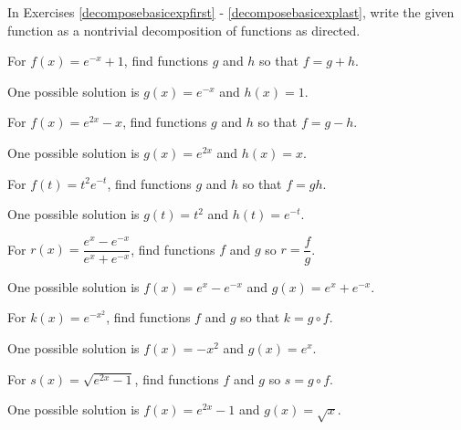 \documentclass{ximera}
\begin{document}
\begin{question}
In Exercises \ref{decomposebasicexpfirst} - \ref{decomposebasicexplast}, write the given function as a nontrivial decomposition of functions as directed.

\begin{problem}\label{decomposebasicexpfirst}
For $f(x) = e^{-x} +1 $, find functions $g$ and $h$ so that $f=g+h$.

\begin{solution}
One possible solution is $g(x)  = e^{-x}$ and $h(x) = 1$.
\end{solution}
\end{problem}

\begin{problem}
For $f(x) = e^{2x} - x$, find functions $g$ and $h$ so that $f=g-h$.

\begin{solution}
One possible solution is $g(x) = e^{2x}$ and $h(x) = x$.
\end{solution}

\end{problem}  

\begin{problem}
For $f(t) = t^2 e^{-t}$, find functions $g$ and $h$ so that $f=gh$.

\begin{solution}
One possible solution is $g(t) = t^2$ and $h(t) = e^{-t}$.
\end{solution}

\end{problem}

\begin{problem}
For $r(x) = \dfrac{e^{x} - e^{-x}}{e^{x}+e^{-x}}$, find functions $f$ and $g$ so $r = \dfrac{f}{g}$.

\begin{solution}
One possible solution is $f(x) = e^{x} - e^{-x}$ and $g(x) = e^{x}+e^{-x}$.
\end{solution}

\end{problem}

\begin{problem}
For $k(x) = e^{-x^2}$, find functions $f$ and $g$  so that $k = g \circ f$.

\begin{solution}
One possible solution is $f(x) = -x^2$ and $g(x) = e^{x}$.
\end{solution}
\end{problem}

\begin{problem}\label{decomposebasicexplast}
For $s(x) =\sqrt{e^{2x} - 1}$, find functions $f$ and $g$ so $s = g \circ f$.

\begin{solution}
One possible solution is $f(x) = e^{2x} -1$ and $g(x) = \sqrt{x}$.
\end{solution}

\end{problem}
\end{question}
\end{document}

